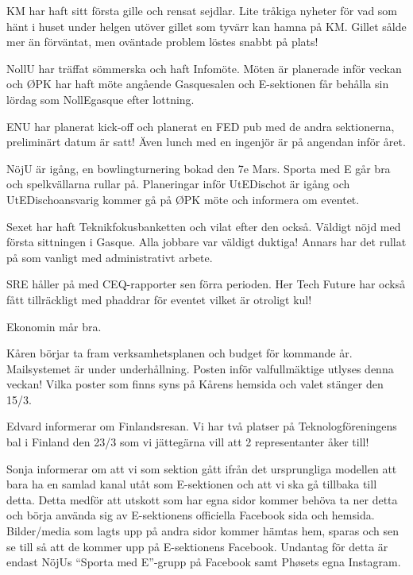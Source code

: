 \documentclass[10pt]{article}
\begin{document}
\begin{paragrafer}
\begin{paragrafer}
KM har haft sitt första gille och rensat sejdlar. Lite tråkiga nyheter för vad som hänt i huset under helgen utöver gillet som tyvärr kan hamna på KM. Gillet sålde mer än förväntat, men oväntade problem löstes snabbt på plats!

NollU har träffat sömmerska och haft Infomöte. Möten är planerade inför veckan och ØPK har haft möte angående Gasquesalen och E-sektionen får behålla sin lördag som NollEgasque efter lottning.

ENU har planerat kick-off och planerat en FED pub med de andra sektionerna, preliminärt datum är satt! Även lunch med en ingenjör är på angendan inför året.

NöjU är igång, en bowlingturnering bokad den 7e Mars. Sporta med E går bra och spelkvällarna rullar på. Planeringar inför UtEDischot är igång och UtEDischoansvarig kommer gå på ØPK möte och informera om eventet. 

Sexet har haft Teknikfokusbanketten och vilat efter den också. Väldigt nöjd med första sittningen i Gasque. Alla jobbare var väldigt duktiga! Annars har det rullat på som vanligt med administrativt arbete.

SRE håller på med CEQ-rapporter sen förra perioden. Her Tech Future har också fått tillräckligt med phaddrar för eventet vilket är otroligt kul!

Ekonomin mår bra.

Kåren börjar ta fram verksamhetsplanen och budget för kommande år.
Mailsystemet är under underhållning. 
Posten inför valfullmäktige utlyses denna veckan! Vilka poster som finns syns på Kårens hemsida och valet stänger den 15/3.

Edvard informerar om Finlandsresan. 
Vi har två platser på Teknologföreningens bal i Finland den 23/3 som vi jättegärna vill att 2 representanter åker till!
\end{paragrafer}

Sonja informerar om att vi som sektion gått ifrån det ursprungliga modellen att bara ha en samlad kanal utåt som E-sektionen och att vi ska gå tillbaka till detta. Detta medför att utskott som har egna sidor kommer behöva ta ner detta och börja använda sig av E-sektionens officiella Facebook sida och hemsida. Bilder/media som lagts upp på andra sidor kommer hämtas hem, sparas och sen se till så att de kommer upp på E-sektionens Facebook. Undantag för detta är endast NöjUs ``Sporta med E''-grupp på Facebook samt Phøsets egna Instagram.


\end{paragrafer}
\end{document}
